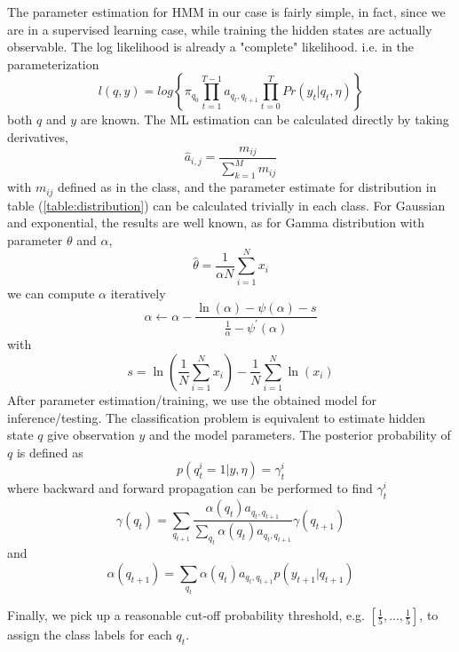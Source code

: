 The parameter estimation for HMM in our case is fairly simple, in fact, since we are in a supervised learning case, while training the hidden states are actually observable. The log likelihood is already a "complete" likelihood. i.e. in the parameterization
\begin{equation} \nonumber
l(q,y) = log\left\{\pi_{q_0}\prod_{t=1}^{T-1} a_{q_t,q_{t+1}}\prod_{t=0}^T Pr(y_t|q_t,\eta)\right\}
\end{equation}
both $q$ and $y$ are known. The ML estimation can be calculated directly by taking derivatives,
\begin{equation} \nonumber
\hat{a}_{i,j} = \frac{m_{ij}}{\sum_{k=1}^M m_{ij}}
\end{equation}
with $m_{ij}$ defined as in the class, and the parameter estimate for distribution in table (\ref{table:distribution}) can be calculated trivially in each class. For Gaussian and exponential, the results are well known, as for Gamma distribution with parameter $\theta$ and $\alpha$,
\begin{equation}
\hat{\theta} = \frac{1}{\alpha N}\sum_{i=1}^Nx_i
\end{equation}
we can compute $\alpha$ iteratively 
\begin{equation}
\alpha \leftarrow \alpha - \frac{ \ln(\alpha) - \psi(\alpha) - s }{ \frac{1}{\alpha} - \psi^{\prime}(\alpha) }
\end{equation}
with 
\begin{equation} \nonumber
s = \ln{\left(\frac{1}{N}\sum_{i=1}^N x_i\right)} - \frac{1}{N}\sum_{i=1}^N\ln{(x_i)}
\end{equation}
After parameter estimation/training, we use the obtained model for inference/testing. The classification problem is equivalent to estimate hidden state $q$ give observation $y$ and the model parameters. The posterior probability of $q$ is defined as 
\begin{equation} \nonumber
p(q_t^i=1|y,\eta) = \gamma_t^i
\end{equation} 
where backward and forward propagation can be performed to find $\gamma_t^i$
\begin{equation}
\gamma (q_t) = \sum_{q_{t+1}} \frac{\alpha (q_t) a_{q_t,q_{t+1}}}{\sum_{q_t} \alpha (q_t)a_{q_t,q_{t+1}}} \gamma (q_{t+1})
\end{equation}
and
\begin{equation}
\alpha (q_{t+1}) = \sum_{q_t} \alpha (q_t)  a_{q_t,q_{t+1}} p(y_{t+1}|q_{t+1})
\end{equation}

Finally, we pick up a reasonable cut-off probability threshold, e.g. $[\frac{1}{5},...,\frac{1}{5}]$, to assign the class labels for each $q_t$.



